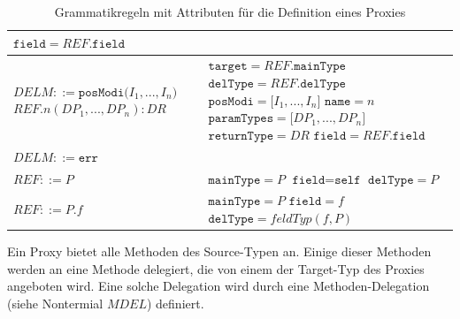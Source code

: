 \documentclass[a4paper,12pt]{article}
\begin{document}
\begin{table}[H]
\begin{tabular}{|p{6cm}|p{8cm}|}
$\texttt{field} = \mathit{REF}\texttt{.field}$
\\
\hline
$\mathit{DELM} ::=\texttt{posModi(} \mathit{I_1},...,\mathit{I_n} \texttt{)}$\newline
$\mathit{REF}\texttt{.}n(\mathit{DP_1},...,\mathit{DP_n}):DR $  
&
$\texttt{target} = \mathit{REF}.\texttt{mainType}$\newline
$\texttt{delType} = \mathit{REF}.\texttt{delType}$\newline
$\texttt{posModi} = \mathit{[I_1},...,\mathit{I_n]}$\newline
$\texttt{name} = \mathit{n}$\newline
$\texttt{paramTypes} = \mathit{[DP_1},...,\mathit{DP_n]}$\newline
$\texttt{returnType} = \mathit{DR}$\newline
$\texttt{field} = \mathit{REF}\texttt{.field}$
\\
\hline
$\mathit{DELM} ::= \texttt{err} $  
&
\\
\hline
$\mathit{REF} ::= \mathit{P}$
& 
$\texttt{mainType} = \mathit{P}$\newline
$\texttt{field} = \texttt{self}$\newline
$\texttt{delType} = \mathit{P}$
\\
\hline
$\mathit{REF} ::= \mathit{P}\texttt{.}\mathit{f}$
&
$\texttt{mainType} = \mathit{P}$\newline
$\texttt{field} = \mathit{f}$\newline
$\texttt{delType} = \mathit{feldTyp(f,P)}$
\\
\hline
\end{tabular}
\caption{Grammatikregeln mit Attributen für die Definition eines Proxies}
 \label{tab:attrGrProxies}
\end{table}
\noindent
Ein Proxy bietet alle Methoden des Source-Typen an. Einige dieser Methoden werden an eine Methode delegiert, die von einem der Target-Typ des Proxies angeboten wird. Eine solche Delegation wird durch eine Methoden-Delegation (siehe Nontermial $\mathit{MDEL}$) definiert.
\end{document}
